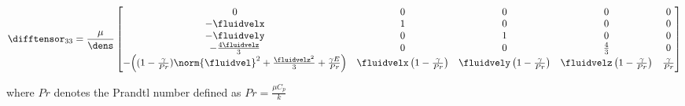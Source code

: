 \documentclass[../main.tex]{subfiles}
\begin{document}
\def\kto{ -\fluidvelx }
\def\keo{ -\fluidvely }
\def\kao{ -\frac{4\fluidvelz}{3} }
\def\kso{ -\Big((1-\frac{\gamma}{Pr})\norm{\fluidvel}^2+\frac{\fluidvelz^2}{3}+\frac{\gamma E}{Pr} \Big)  }
\def\ktt{ 1 }
\def\kst{ \fluidvelx\left(1-\frac{\gamma}{Pr}\right) }
\def\kee{ 1 }
\def\kse{ \fluidvely\left(1-\frac{\gamma}{Pr}\right) }
\def\kaa{ \frac{4}{3} }
\def\ksa{ \fluidvelz\left(1-\frac{\gamma}{Pr}\right) }
\def\kss{ \frac{\gamma}{Pr} }
\begin{align}
\difftensor_{33}=\frac{\mu}{\dens}
\begin{bmatrix}
  0     &    0     &    0     &    0     &    0     \\ %
  \kto  &    \ktt  &    0     &    0     &    0     \\ %
  \keo  &    0     &    \kee  &    0     &    0     \\ %
  \kao  &    0     &    0     &    \kaa  &    0     \\ %
  \kso  &    \kst  &    \kse  &    \ksa  &    \kss  \\ %
\end{bmatrix}
\end{align}

where $Pr$ denotes the Prandtl number defined as $Pr=\frac{\mu C_p}{k}$
\end{document}
